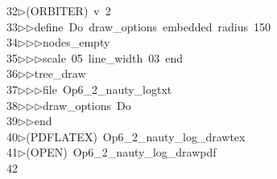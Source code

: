 \begin{tabbing}
32\>$\triangleright$\>(ORBITER)\ v\ 2\ \\[0pt]
33\>$\triangleright$\>$\triangleright$\>define\ Do\ draw\_options\ embedded\ radius\ 150\ \\[0pt]
34\>$\triangleright$\>$\triangleright$\>$\triangleright$\>nodes\_empty\ \\[0pt]
35\>$\triangleright$\>$\triangleright$\>$\triangleright$\>scale\ 05\ line\_width\ 03\ end\ \\[0pt]
36\>$\triangleright$\>$\triangleright$\>tree\_draw\ \\[0pt]
37\>$\triangleright$\>$\triangleright$\>$\triangleright$\>file\ Op6\_2\_nauty\_logtxt\ \\[0pt]
38\>$\triangleright$\>$\triangleright$\>$\triangleright$\>draw\_options\ Do\ \\[0pt]
39\>$\triangleright$\>$\triangleright$\>end\\[0pt]
40\>$\triangleright$\>(PDFLATEX)\ Op6\_2\_nauty\_log\_drawtex\\[0pt]
41\>$\triangleright$\>(OPEN)\ Op6\_2\_nauty\_log\_drawpdf\\[0pt]
42\>\end{tabbing}
